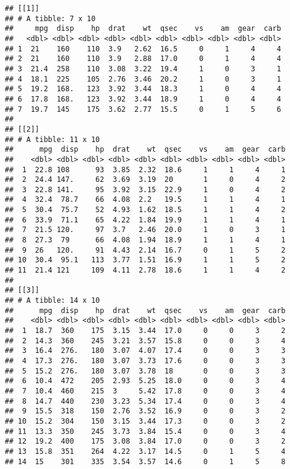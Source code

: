 \documentclass[
]{book}
\begin{document}
\begin{verbatim}
## [[1]]
## # A tibble: 7 x 10
##     mpg  disp    hp  drat    wt  qsec    vs    am  gear  carb
##   <dbl> <dbl> <dbl> <dbl> <dbl> <dbl> <dbl> <dbl> <dbl> <dbl>
## 1  21    160    110  3.9   2.62  16.5     0     1     4     4
## 2  21    160    110  3.9   2.88  17.0     0     1     4     4
## 3  21.4  258    110  3.08  3.22  19.4     1     0     3     1
## 4  18.1  225    105  2.76  3.46  20.2     1     0     3     1
## 5  19.2  168.   123  3.92  3.44  18.3     1     0     4     4
## 6  17.8  168.   123  3.92  3.44  18.9     1     0     4     4
## 7  19.7  145    175  3.62  2.77  15.5     0     1     5     6
## 
## [[2]]
## # A tibble: 11 x 10
##      mpg  disp    hp  drat    wt  qsec    vs    am  gear  carb
##    <dbl> <dbl> <dbl> <dbl> <dbl> <dbl> <dbl> <dbl> <dbl> <dbl>
##  1  22.8 108      93  3.85  2.32  18.6     1     1     4     1
##  2  24.4 147.     62  3.69  3.19  20       1     0     4     2
##  3  22.8 141.     95  3.92  3.15  22.9     1     0     4     2
##  4  32.4  78.7    66  4.08  2.2   19.5     1     1     4     1
##  5  30.4  75.7    52  4.93  1.62  18.5     1     1     4     2
##  6  33.9  71.1    65  4.22  1.84  19.9     1     1     4     1
##  7  21.5 120.     97  3.7   2.46  20.0     1     0     3     1
##  8  27.3  79      66  4.08  1.94  18.9     1     1     4     1
##  9  26   120.     91  4.43  2.14  16.7     0     1     5     2
## 10  30.4  95.1   113  3.77  1.51  16.9     1     1     5     2
## 11  21.4 121     109  4.11  2.78  18.6     1     1     4     2
## 
## [[3]]
## # A tibble: 14 x 10
##      mpg  disp    hp  drat    wt  qsec    vs    am  gear  carb
##    <dbl> <dbl> <dbl> <dbl> <dbl> <dbl> <dbl> <dbl> <dbl> <dbl>
##  1  18.7  360    175  3.15  3.44  17.0     0     0     3     2
##  2  14.3  360    245  3.21  3.57  15.8     0     0     3     4
##  3  16.4  276.   180  3.07  4.07  17.4     0     0     3     3
##  4  17.3  276.   180  3.07  3.73  17.6     0     0     3     3
##  5  15.2  276.   180  3.07  3.78  18       0     0     3     3
##  6  10.4  472    205  2.93  5.25  18.0     0     0     3     4
##  7  10.4  460    215  3     5.42  17.8     0     0     3     4
##  8  14.7  440    230  3.23  5.34  17.4     0     0     3     4
##  9  15.5  318    150  2.76  3.52  16.9     0     0     3     2
## 10  15.2  304    150  3.15  3.44  17.3     0     0     3     2
## 11  13.3  350    245  3.73  3.84  15.4     0     0     3     4
## 12  19.2  400    175  3.08  3.84  17.0     0     0     3     2
## 13  15.8  351    264  4.22  3.17  14.5     0     1     5     4
## 14  15    301    335  3.54  3.57  14.6     0     1     5     8
\end{verbatim}
\end{document}

